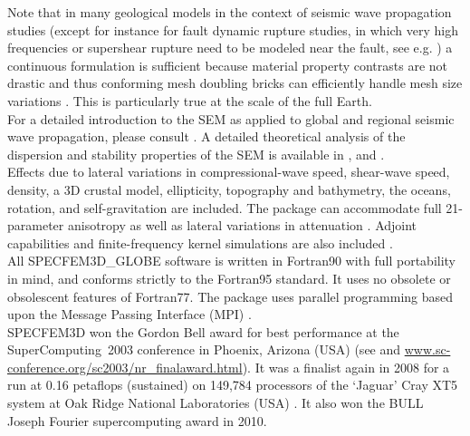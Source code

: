 \documentclass[oneside,english]{book}
\begin{document}
Note that in many geological models in the context of seismic wave propagation studies
(except for instance for fault dynamic rupture studies, in which very high frequencies or supershear rupture need to be modeled near the fault, see e.g. \cite{BeGlCrViPi07,BeGlCrVi09,PuAmKa09,TaCrEtViBeSa10})
a continuous formulation is sufficient because material property contrasts are not drastic and thus
conforming mesh doubling bricks can efficiently handle mesh size variations \citep{KoTr02a,KoLiTrSuStSh04,LeChLiKoHuTr08,LeChKoHuTr09,LeKoHuTr09}.
This is particularly true at the scale of the full Earth.\\

For a detailed introduction to the SEM as applied to
global and regional seismic wave propagation, please consult \citet{KoVi98,KoTr99,Ch00,KoTr02a,KoTr02b,KoRiTr02,ChCaVi03,CaChViMo03,ChVa04,ChKoViCaVaFe07,TrKoLi08}.
A detailed theoretical analysis of the dispersion
and stability properties of the SEM is available in \citet{Coh02}, \citet{DeSe07} and \citet{SeOl07}.\\

Effects due to lateral variations in compressional-wave
speed, shear-wave speed, density, a 3D crustal model, ellipticity,
topography and bathymetry, the oceans, rotation, and self-gravitation are included.
The package can accommodate full 21-parameter anisotropy \citep{ChTr07}
as well as lateral variations in attenuation \citep{SavWiTr05}. Adjoint
capabilities and finite-frequency kernel simulations are also included
\citep{LiTr06,TrKoLi08,LiTr08,FiIgBuKe09,ViOp09}.\\

All SPECFEM3D\_GLOBE software is written in Fortran90 with full portability
in mind, and conforms strictly to the Fortran95 standard. It uses
no obsolete or obsolescent features of Fortran77. The package uses
parallel programming based upon the Message Passing Interface (MPI)
\citep{GrLuSk94,Pac97}.\\

SPECFEM3D won the Gordon Bell award for best performance at the SuperComputing~2003
conference in Phoenix, Arizona (USA) (see \cite{KoTsChTr03}
and \url{www.sc-conference.org/sc2003/nr_finalaward.html}).
It was a finalist again in 2008 for a run at 0.16 petaflops (sustained) on 149,784 processors of the `Jaguar' Cray XT5 system at Oak Ridge National Laboratories (USA) \citep{CaKoLaTiMiLeSnTr08}.
It also won the BULL Joseph Fourier supercomputing award in 2010.\\
\end{document}
